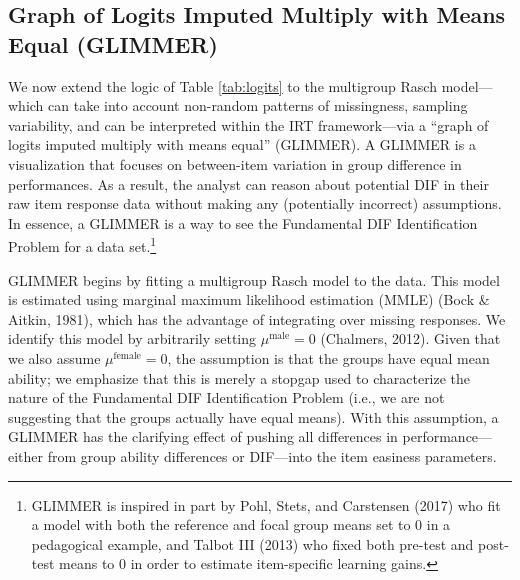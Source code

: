 \documentclass[
  english,
  man,floatsintext]{apa6}
\begin{document}
\hypertarget{graph-of-logits-imputed-multiply-with-means-equal-glimmer}{%
\subsection{Graph of Logits Imputed Multiply with Means Equal (GLIMMER)}\label{graph-of-logits-imputed-multiply-with-means-equal-glimmer}}

We now extend the logic of Table \ref{tab:logits} to the multigroup Rasch model---which can take into account non-random patterns of missingness, sampling variability, and can be interpreted within the IRT framework---via a ``graph of logits imputed multiply with means equal'' (GLIMMER). A GLIMMER is a visualization that focuses on between-item variation in group difference in performances. As a result, the analyst can reason about potential DIF in their raw item response data without making any (potentially incorrect) assumptions. In essence, a GLIMMER is a way to see the Fundamental DIF Identification Problem for a data set.\footnote{GLIMMER is inspired in part by Pohl, Stets, and Carstensen (2017) who fit a model with both the reference and focal group means set to 0 in a pedagogical example, and Talbot III (2013) who fixed both pre-test and post-test means to 0 in order to estimate item-specific learning gains.}

GLIMMER begins by fitting a multigroup Rasch model to the data. This model is estimated using marginal maximum likelihood estimation (MMLE) (Bock \& Aitkin, 1981), which has the advantage of integrating over missing responses. We identify this model by arbitrarily setting \(\mu^\text{male} = 0\) (Chalmers, 2012). Given that we also assume \(\mu^\text{female} = 0\), the assumption is that the groups have equal mean ability; we emphasize that this is merely a stopgap used to characterize the nature of the Fundamental DIF Identification Problem (i.e., we are not suggesting that the groups actually have equal means). With this assumption, a GLIMMER has the clarifying effect of pushing all differences in performance---either from group ability differences or DIF---into the item easiness parameters.
\end{document}
